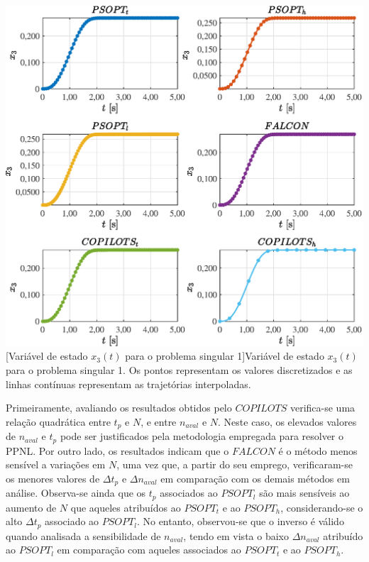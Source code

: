 \noindent
\begin{minipage}{\textwidth}
	\vspace{\onelineskip}
	\centering
	\includegraphics[scale=0.7]{fig/resultados/singular1/traj/x/x_3}
	[Variável de estado $x_3(t)$ para o problema singular 1]{Variável de estado $x_3(t)$ para o problema singular 1. Os pontos representam os valores discretizados e as linhas contínuas representam as trajetórias interpoladas.}
	\label{fig:singular1:x:x3}
	\vspace{\onelineskip}
\end{minipage}

Primeiramente, avaliando os resultados obtidos pelo $ COPILOTS $ verifica-se uma relação quadrática entre $ t_p $ e $ N $, e entre $ n_{aval} $ e $ N $. Neste caso, os elevados valores de $ n_{aval} $ e $ t_p $ pode ser justificados pela metodologia empregada para resolver o PPNL. Por outro lado, os resultados indicam que o $ FALCON $ é o método menos sensível a variações em $ N $, uma vez que, a partir do seu emprego, verificaram-se os menores valores de $ \Delta t_p $ e $ \Delta n_{aval} $ em comparação com os demais métodos em análise. Observa-se ainda que os $ t_p $ associados ao $ PSOPT_l $ são mais sensíveis ao aumento de $ N $ que aqueles atribuídos ao $ PSOPT_t $ e ao $ PSOPT_h $, considerando-se o alto $ \Delta t_p $ associado ao $ PSOPT_l $. No entanto, observou-se que o inverso é válido quando analisada a sensibilidade de $ n_{aval} $, tendo em vista o baixo $ \Delta n_{aval} $ atribuído ao $ PSOPT_l $ em comparação com aqueles associados ao $ PSOPT_t $ e ao $ PSOPT_h $.

